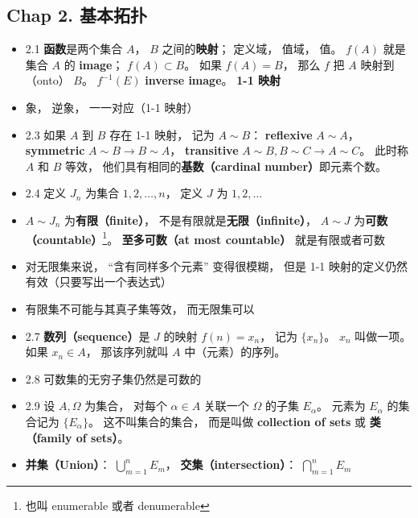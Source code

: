 \subsection{Chap 2. 基本拓扑}

\begin{itemize}
\item 2.1 \textbf{函数}是两个集合 $A$， $B$ 之间的\textbf{映射}； 定义域， 值域， 值。 $f(A)$ 就是集合 $A$ 的 \textbf{image}； $f(A) \subset B$。 如果 $f(A) = B$， 那么 $f$ 把 $A$ 映射到（onto） $B$。 $f^{-1}(E)$ \textbf{inverse image}。 \textbf{1-1 映射}

\item 象， 逆象， 一一对应（1-1 映射）

\item 2.3 如果 $A$ 到 $B$ 存在 1-1 映射， 记为 $A \sim B$： \textbf{reflexive} $A \sim A$， \textbf{symmetric} $A \sim B \to B \sim A$， \textbf{transitive} $A \sim B, B \sim C \to A \sim C$。 此时称 $A$ 和 $B$ 等效， 他们具有相同的\textbf{基数（cardinal number）}即元素个数。

\item 2.4 定义 $J_n$ 为集合 $1,2,\dots, n$， 定义 $J$ 为 $1, 2, \dots$

\item $A \sim J_n$ 为\textbf{有限（finite）}， 不是有限就是\textbf{无限（infinite）}， $A \sim J$ 为\textbf{可数（countable）}\footnote{也叫 enumerable 或者 denumerable}。 \textbf{至多可数（at most countable）} 就是有限或者可数

\item 对无限集来说， “含有同样多个元素” 变得很模糊， 但是 1-1 映射的定义仍然有效（只要写出一个表达式）

\item 有限集不可能与其真子集等效， 而无限集可以

\item 2.7 \textbf{数列（sequence）}是 $J$ 的映射 $f(n) = x_n$， 记为 $\{x_n\}$。 $x_n$ 叫做一项。 如果 $x_n \in A$， 那该序列就叫 $A$ 中（元素）的序列。

\item 2.8 可数集的无穷子集仍然是可数的

\item 2.9 设 $A,\Omega$ 为集合， 对每个 $\alpha\in A$ 关联一个 $\Omega$ 的子集 $E_\alpha$。 元素为 $E_\alpha$ 的集合记为 $\{E_\alpha\}$。 这不叫集合的集合， 而是叫做 \textbf{collection of sets} 或 \textbf{类（family of sets）}。

\item \textbf{并集（Union）}： $\bigcup\limits_{m = 1}^n E_m$， \textbf{交集（intersection）}： $\bigcap\limits_{m = 1}^n E_m$


\end{itemize}
